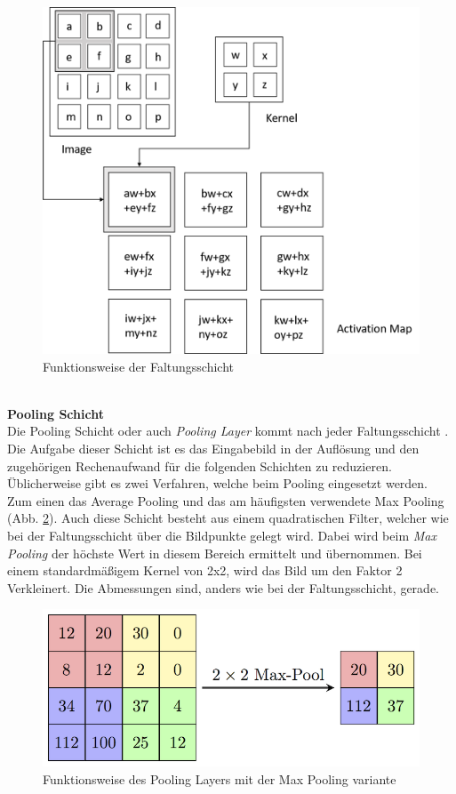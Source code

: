 \documentclass[a4paper,12pt,oneside]{article}
\begin{document}
\begin{figure}
	[h]
	\centering
	\includegraphics[scale=0.5]{Sources/CNN.png}
	\caption{Funktionsweise der Faltungsschicht \cite{convolutional2019layer}}
	\label{img:faltungsschicht}
\end{figure}\\
\textbf{Pooling Schicht}\\
Die Pooling Schicht oder auch \textit{Pooling Layer} kommt nach jeder Faltungsschicht \cite[336f.]{goodfellow2016deep}. Die Aufgabe dieser Schicht ist es das Eingabebild in der Auflösung und den zugehörigen Rechenaufwand für die folgenden Schichten zu reduzieren. Üblicherweise gibt es zwei Verfahren, welche beim Pooling eingesetzt werden. Zum einen das Average Pooling und das am häufigsten verwendete Max Pooling (Abb. \ref{img:maxpooling}). Auch diese Schicht besteht aus einem quadratischen Filter, welcher wie bei der Faltungsschicht über die Bildpunkte gelegt wird. Dabei wird beim \textit{Max Pooling} der höchste Wert in diesem Bereich ermittelt und übernommen. Bei einem standardmäßigem Kernel von 2x2, wird das Bild um den Faktor 2 Verkleinert. Die Abmessungen sind, anders wie bei der Faltungsschicht, gerade. 
\newpage
\begin{figure}
	[h]
	\centering
	\includegraphics[scale=2.0]{Sources/MaxpoolSample2.png}
	\caption{Funktionsweise des Pooling Layers mit der Max Pooling variante \cite{pooling2018layer}}
	\label{img:maxpooling}
\end{figure}
\end{document}
